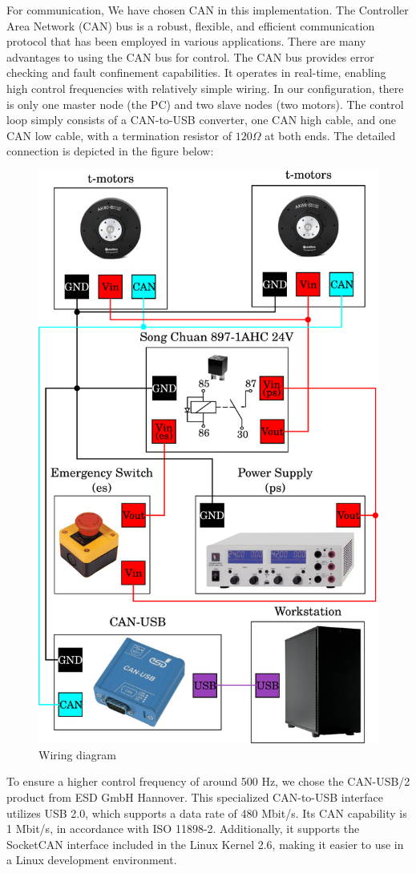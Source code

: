 For communication, We have chosen CAN in this implementation. The Controller Area Network (CAN) bus is a robust, flexible, and efficient communication protocol that has been employed in various applications. There are many advantages to using the CAN bus for control. The CAN bus provides error checking and fault confinement capabilities. It operates in real-time, enabling high control frequencies with relatively simple wiring. In our configuration, there is only one master node (the PC) and two slave nodes (two motors). The control loop simply consists of a CAN-to-USB converter, one CAN high cable, and one CAN low cable, with a termination resistor of \(120 \Omega\) at both ends. The detailed connection is depicted in the figure below:

\begin{figure}[H]
    \centering
    \includegraphics[width=0.7\linewidth]{figures/hardware_setup/wiring-diagram.png}
    \caption{Wiring diagram}
    \label{fig:my_label}
\end{figure}

To ensure a higher control frequency of around 500 Hz, we chose the CAN-USB/2 product from ESD GmbH Hannover. This specialized CAN-to-USB interface utilizes USB 2.0, which supports a data rate of 480 Mbit/s. Its CAN capability is 1 Mbit/s, in accordance with ISO 11898-2. Additionally, it supports the SocketCAN interface included in the Linux Kernel 2.6, making it easier to use in a Linux development environment.

